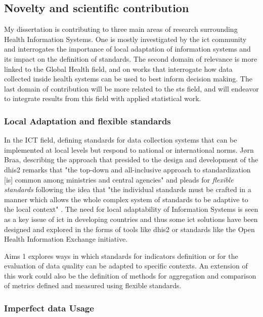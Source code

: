 \subsection{Novelty and scientific contribution}

My dissertation is contributing to three main areas of research surrounding Health Information Systems. One is mostly investigated by the \gls{ict} community and interrogates the importance of local adaptation of information systems and its impact on the definition of standards. The second domain of relevance is more linked to the Global Health field, and on works that interrogate how data collected inside health systems can be used to best inform decision making. The last domain of contribution will be more related to the \gls{sts} field, and will endeavor to integrate results from this field with applied statistical work.

\subsubsection{Local Adaptation and flexible standards}

In the ICT field, defining standards for data collection systems that can be implemented at local levels but respond to national or international norms. Jørn Braa, describing the approach that presided to the design and development of the \gls{dhis2} remarks that "the top-down and all-inclusive approach to standardization [is] common among ministries and central agencies" and pleads for \textit{flexible standards} following the idea that "the individual standards must be crafted in a manner which allows the whole complex system of standards to be adaptive to the local context" \citep{braa_developing_2007}. The need for local adaptability of Information Systems is seen as a key issue of \gls{ict} in developing countries \citep{macfarlane_harmonizing_2005,walsham_research_2006,walsham_foreword:_2007,jacucci_standardization_2006} and thus some \gls{ict} solutions have been designed and explored in the forms of tools like \gls{dhis2} or standards like the Open Health Information Exchange initiative.

Aims 1 explores ways in which standards for indicators definition or for the evaluation of data quality can be adapted to specific contexts. An extension of this work could also be the definition of methods for aggregation and comparison of metrics defined and measured using flexible standards.

\subsubsection{Imperfect data Usage}

